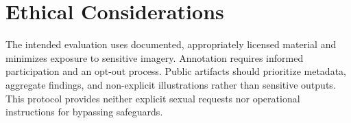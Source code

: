 \documentclass[11pt]{article}
\begin{document}
\section*{Ethical Considerations}
The intended evaluation uses documented, appropriately licensed material and minimizes exposure to sensitive imagery. Annotation requires informed participation and an opt-out process. Public artifacts should prioritize metadata, aggregate findings, and non-explicit illustrations rather than sensitive outputs. This protocol provides neither explicit sexual requests nor operational instructions for bypassing safeguards.

\clearpage

\end{document}
